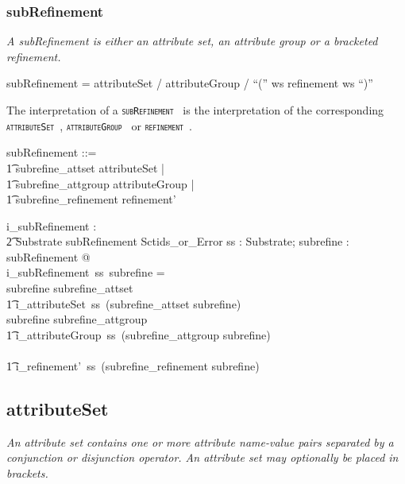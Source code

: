 \documentclass{article}
\def\spec#1{{\tt \small \textsc{{#1}} }}
\def\bnf#1{{\scriptsize {{#1}} }}
\def\desc#1{{\small \textsl{{#1}} }}
\begin{document}
\subsubsection{subRefinement}
\begin{framed}
\desc{ A subRefinement is either an attribute set, an attribute group or a bracketed refinement.}
\end{framed}

\begin{framed}
\noindent
\bnf{subRefinement = attributeSet / attributeGroup / ``('' ws refinement ws ``)''}
\end{framed}

The interpretation of a \spec{subRefinement} is the interpretation of the corresponding \spec{attributeSet}, \spec{attributeGroup} or \spec{refinement}.

\begin{zed}
subRefinement ::= \\
\t1 subrefine\_attset \ldata attributeSet \rdata | \\
\t1 subrefine\_attgroup \ldata attributeGroup \rdata | \\
\t1 subrefine\_refinement \ldata refinement' \rdata
\end{zed}


\begin{axdef}
   i\_subRefinement : \\
\t2 Substrate \fun subRefinement \fun Sctids\_or\_Error
\where
   \forall ss : Substrate; subrefine : subRefinement @ \\
   i\_subRefinement~ss~subrefine = \\
   \IF subrefine \in \ran subrefine\_attset \THEN\\
   \t1  i\_attributeSet~ss~(subrefine\_attset \inv subrefine) \\
   \ELSE \IF subrefine \in \ran subrefine\_attgroup \THEN \\
   \t1 i\_attributeGroup~ss~(subrefine\_attgroup \inv subrefine) \\
  \ELSE \\
  \t1 i\_refinement'~ss~(subrefine\_refinement \inv subrefine)
\end{axdef}

\subsection{attributeSet}
\begin{framed}
\desc{An attribute set contains one or more attribute name-value pairs separated by a conjunction or disjunction operator. An attribute set may optionally be placed in brackets.}
\end{framed}
\end{document}
